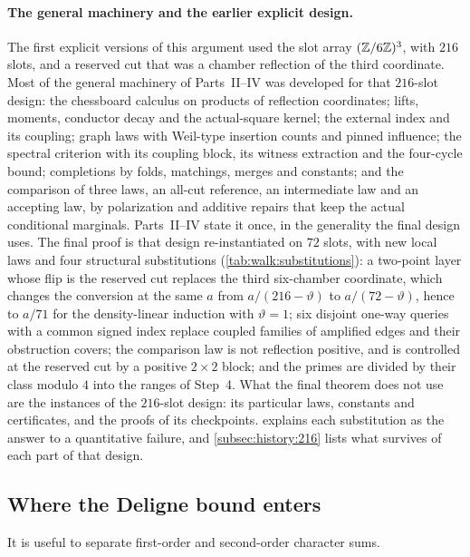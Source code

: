 \paragraph{The general machinery and the earlier explicit design.}
The first explicit versions of this argument used the slot array
$(\mathbb Z/6\mathbb Z)^3$, with $216$ slots, and a reserved cut that was a chamber
reflection of the third coordinate. Most of the general machinery of
Parts~II--IV was developed for that $216$-slot design: the chessboard
calculus on products of reflection coordinates; lifts, moments, conductor
decay and the actual-square kernel; the external index and its coupling;
graph laws with Weil-type insertion counts and pinned influence; the
spectral criterion with its coupling block, its witness extraction and the
four-cycle bound; completions by folds, matchings, merges and constants;
and the comparison of three laws, an all-cut reference, an intermediate
law and an accepting law, by polarization and additive repairs that keep
the actual conditional marginals. Parts~II--IV state it once, in the
generality the final design uses. The final proof is that design
re-instantiated on $72$ slots, with new local laws and four structural
substitutions (\cref{tab:walk:substitutions}): a two-point layer whose
flip is the reserved cut replaces the third six-chamber coordinate, which
changes the conversion at the same $a$ from $a/(216-\vartheta)$ to
$a/(72-\vartheta)$, hence to $a/71$ for the density-linear
induction with $\vartheta=1$; six disjoint one-way queries
with a common signed index replace coupled families of amplified edges and
their obstruction covers; the comparison law is not reflection positive,
and is controlled at the reserved cut by a positive $2\times2$
block; and the primes are divided by
their class modulo $4$ into the ranges of Step~4. What the final theorem
does not use are the instances of the $216$-slot design: its particular
laws, constants and certificates, and the proofs of its checkpoints.
 explains each substitution as the answer to a
quantitative failure, and \cref{subsec:history:216} lists what survives of
each part of that design.

\subsection{Where the Deligne bound enters}\label{subsec:intro:deligne}

It is useful to separate first-order and second-order character sums.

